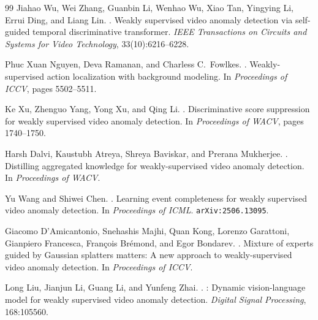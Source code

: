 \documentclass[11pt]{article}
\begin{document}
\begin{thebibliography}{99}
Jiahao Wu, Wei Zhang, Guanbin Li, Wenhao Wu, Xiao Tan, Yingying Li,
  Errui Ding, and Liang Lin.
.
\newblock Weakly supervised video anomaly detection via self-guided temporal
  discriminative transformer.
\newblock \textit{IEEE Transactions on Circuits and Systems for Video
  Technology}, 33(10):6216--6228.


Phuc Xuan Nguyen, Deva Ramanan, and Charless C.\ Fowlkes.
.
\newblock Weakly-supervised action localization with background modeling.
\newblock In \textit{Proceedings of ICCV}, pages 5502--5511.


Ke Xu, Zhenguo Yang, Yong Xu, and Qing Li.
.
\newblock Discriminative score suppression for weakly supervised video anomaly
  detection.
\newblock In \textit{Proceedings of WACV}, pages 1740--1750.

Harsh Dalvi, Kaustubh Atreya, Shreya Baviskar, and Prerana Mukherjee.
.
\newblock Distilling aggregated knowledge for weakly-supervised video anomaly
  detection.
\newblock In \textit{Proceedings of WACV}.


Yu Wang and Shiwei Chen.
.
\newblock Learning event completeness for weakly supervised video anomaly
  detection.
\newblock In \textit{Proceedings of ICML}.
\newblock \texttt{arXiv:2506.13095}.


Giacomo D'Amicantonio, Snehashis Majhi, Quan Kong, Lorenzo Garattoni,
  Gianpiero Francesca, Fran\c{c}ois Br\'{e}mond, and Egor Bondarev.
.
\newblock Mixture of experts guided by {Gaussian} splatters matters:
  A new approach to weakly-supervised video anomaly detection.
\newblock In \textit{Proceedings of ICCV}.


Long Liu, Jianjun Li, Guang Li, and Yunfeng Zhai.
.
: Dynamic vision-language model for weakly supervised
  video anomaly detection.
\newblock \textit{Digital Signal Processing}, 168:105560.

\end{thebibliography}
\end{document}
